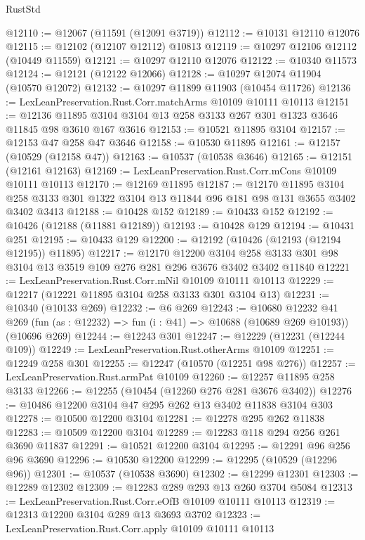 \begin{lexlean}{RustStd}
\begin{coremodule}
@12110 := @12067 (@11591 (@12091 @3719))
@12112 := @10131 @12110 @12076
@12115 := @12102 (@12107 @12112) @10813
@12119 := @10297 @12106 @12112 (@10449 @11559)
@12121 := @10297 @12110 @12076
@12122 := @10340 @11573
@12124 := @12121 (@12122 @12066)
@12128 := @10297 @12074 @11904 (@10570 @12072)
@12132 := @10297 @11899 @11903 (@10454 @11726)
@12136 := LexLeanPreservation.Rust.Corr.matchArms @10109 @10111 @10113
@12151 := @12136 @11895 @3104 @3104 @13 @258 @3133 @267 @301 @1323 @3646 @11845 @98 @3610 @167 @3616
@12153 := @10521 @11895 @3104
@12157 := @12153 @47 @258 @47 @3646
@12158 := @10530 @11895
@12161 := @12157 (@10529 (@12158 @47))
@12163 := @10537 (@10538 @3646)
@12165 := @12151 (@12161 @12163)
@12169 := LexLeanPreservation.Rust.Corr.mCons @10109 @10111 @10113
@12170 := @12169 @11895
@12187 := @12170
    @11895
    @3104
    @258
    @3133
    @301
    @1322
    @3104
    @13
    @11844
    @96
    @181
    @98
    @131
    @3655
    @3402
    @3402
    @3413
@12188 := @10428 @152
@12189 := @10433 @152
@12192 := @10426 (@12188 (@11881 @12189))
@12193 := @10428 @129
@12194 := @10431 @251
@12195 := @10433 @129
@12200 := @12192 (@10426 (@12193 (@12194 @12195)) @11895)
@12217 := @12170
    @12200
    @3104
    @258
    @3133
    @301
    @98
    @3104
    @13
    @3519
    @109
    @276
    @281
    @296
    @3676
    @3402
    @3402
    @11840
@12221 := LexLeanPreservation.Rust.Corr.mNil @10109 @10111 @10113
@12229 := @12217 (@12221 @11895 @3104 @258 @3133 @301 @3104 @13)
@12231 := @10340 (@10133 @269)
@12232 := @6 @269
@12243 := @10680
    @12232
    @41
    @269
    (fun (as : @12232) => fun (i : @41) => @10688 (@10689 @269 @10193))
    (@10696 @269)
@12244 := @12243 @301
@12247 := @12229 (@12231 (@12244 @109))
@12249 := LexLeanPreservation.Rust.otherArms @10109
@12251 := @12249 @258 @301
@12255 := @12247 (@10570 (@12251 @98 @276))
@12257 := LexLeanPreservation.Rust.armPat @10109
@12260 := @12257 @11895 @258 @3133
@12266 := @12255 (@10454 (@12260 @276 @281 @3676 @3402))
@12276 := @10486 @12200 @3104 @47 @295 @262 @13 @3402 @11838 @3104 @303
@12278 := @10500 @12200 @3104
@12281 := @12278 @295 @262 @11838
@12283 := @10509 @12200 @3104
@12289 := @12283 @118 @294 @256 @261 @3690 @11837
@12291 := @10521 @12200 @3104
@12295 := @12291 @96 @256 @96 @3690
@12296 := @10530 @12200
@12299 := @12295 (@10529 (@12296 @96))
@12301 := @10537 (@10538 @3690)
@12302 := @12299 @12301
@12303 := @12289 @12302
@12309 := @12283 @289 @293 @13 @260 @3704 @5084
@12313 := LexLeanPreservation.Rust.Corr.eOfB @10109 @10111 @10113
@12319 := @12313 @12200 @3104 @289 @13 @3693 @3702
@12323 := LexLeanPreservation.Rust.Corr.apply @10109 @10111 @10113

\end{coremodule}
\end{lexlean}
